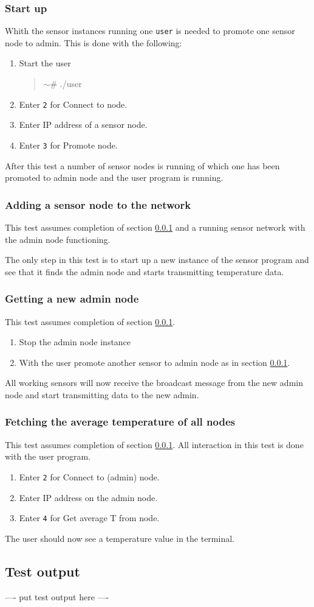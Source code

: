 \subsubsection{Start up}
\label{subsubsec:startuptest}
Whith the sensor instances running one \texttt{user} is needed to promote one sensor node to admin. This is done with the following:
\begin{enumerate}
    \item Start the user
        \begin{quotation}
            $\sim$\# ./user
        \end{quotation}
    \item Enter \texttt{2} for Connect to node.
    \item Enter IP address of a sensor node.
    \item Enter \texttt{3} for Promote node.
\end{enumerate}
After this test a number of sensor nodes is running of which one has been promoted to admin node and the user program is running.
\subsubsection{Adding a sensor node to the network}
\label{subsubsec:addingnodetest}
This test assumes completion of section \ref{subsubsec:startuptest} and a running sensor network with the admin node functioning. 

The only step in this test is to start up a new instance of the sensor program and see that it finds the admin node and starts transmitting temperature data.

\subsubsection{Getting a new admin node}
\label{subsubsec:newadmintest}
This test assumes completion of section \ref{subsubsec:startuptest}.
\begin{enumerate}
    \item Stop the admin node instance
    \item With the user promote another sensor to admin node as in section \ref{subsubsec:startuptest}.
\end{enumerate}
All working sensors will now receive the broadcast message from the new admin node and start transmitting data to the new admin.

\subsubsection{Fetching the average temperature of all nodes}
\label{subsubsec:fetchtemptest}
This test assumes completion of section \ref{subsubsec:startuptest}. All interaction in this test is done with the user program.
\begin{enumerate}
    \item Enter \texttt{2} for Connect to (admin) node.
    \item Enter IP address on the admin node.
    \item Enter \texttt{4} for Get average T from node.
\end{enumerate}
The user should now see a temperature value in the terminal.
\subsection{Test output}
\label{subsec:testoutput}

---- put test output here ----
